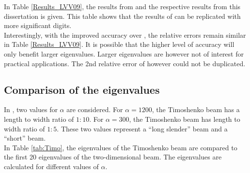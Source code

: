 \documentclass[../../main.tex]{subfiles}
\begin{document}
In Table \ref{Results_LVV09}, the results from \cite{LVV09} and the respective results from this dissertation is given. This table shows that the results of \cite{LVV09} can be replicated with more significant digits.\\

Interestingly, with the improved accuracy over \cite{LVV09}, the relative errors remain similar in Table \ref{Results_LVV09}. It is possible that the higher level of accuracy will only benefit larger eigenvalues. Larger eigenvalues are however not of interest for practical applications. The 2nd relative error of \cite{LVV09} however could not be duplicated.

\subsection{Comparison of the eigenvalues}
In \cite{LVV09}, two values for $\alpha$ are considered. For $\alpha = 1200$, the Timoshenko beam has a length to width ratio of $1:10$. For $\alpha = 300$, the Timoshenko beam has length to width ratio of $1:5$. These two values represent a ``long slender'' beam and a ``short'' beam.\\

In Table \ref{tab:Timo}, the eigenvalues of the Timoshenko beam are compared to the first 20 eigenvalues of the two-dimensional beam. The eigenvalues are calculated for different values of $\alpha$.\\
\end{document}
